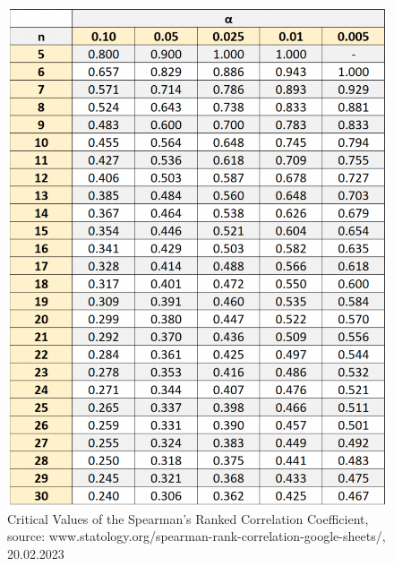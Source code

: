 \begin{figure}
\includegraphics[width=1.0\linewidth]{images/spearmancritical.png}
\caption{Critical Values of the Spearman’s Ranked Correlation Coefficient, source: www.statology.org/spearman-rank-correlation-google-sheets/, 20.02.2023}
\label{fig:spearmancritical}
\end{figure}



